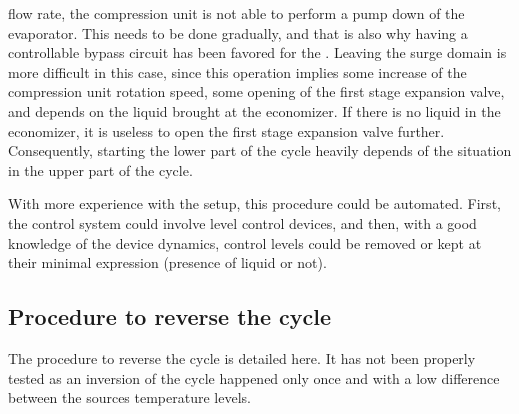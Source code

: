 \begin{enumerate}
  flow rate, the compression unit is not able to perform a pump down
  of the evaporator. This needs to be done gradually, and that is also
  why having a controllable bypass circuit has been favored for the
  \BWP{}. Leaving the surge domain is more difficult in this case,
  since this operation implies some increase of the compression unit
  rotation speed, some opening of the first stage expansion valve, and
  depends on the liquid brought at the economizer. If there is no
  liquid in the economizer, it is useless to open the first stage
  expansion valve further. Consequently, starting the lower part of
  the cycle heavily depends of the situation in the upper part of the
  cycle.
\end{enumerate}

With more experience with the setup, this procedure could be
automated. First, the control system could involve level control
devices, and then, with a good knowledge of the device dynamics,
control levels could be removed or kept at their minimal expression
(presence of liquid or not).

\subsection{Procedure to reverse the cycle}
\label{sec:awp-proc-reversing}

The procedure to reverse the cycle is detailed here. It has not been
properly tested as an inversion of the cycle happened only once and
with a low difference between the sources temperature levels.

